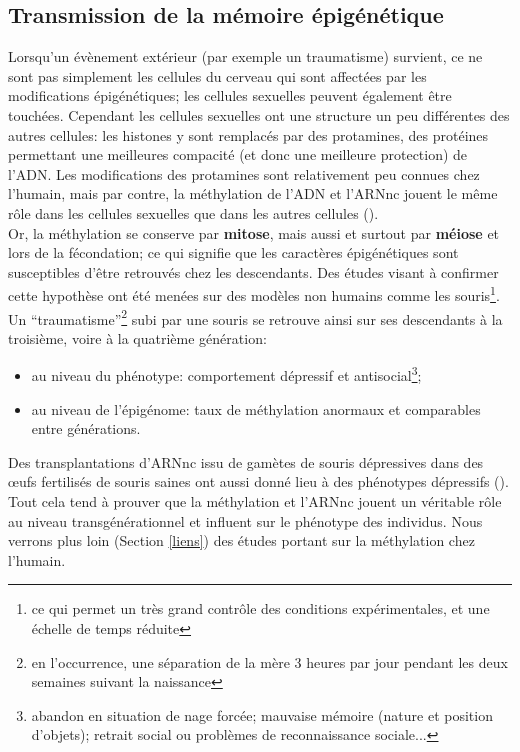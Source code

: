 \documentclass[french]{article}
\begin{document}
			\subsection{Transmission de la mémoire épigénétique}
				Lorsqu'un évènement extérieur (par exemple un traumatisme) survient, ce ne sont pas simplement les cellules du cerveau qui sont affectées par les modifications épigénétiques; les cellules sexuelles peuvent également être touchées. Cependant les cellules sexuelles ont une structure un peu différentes des autres cellules: les histones y sont remplacés par des protamines, des protéines permettant une meilleures compacité (et donc une meilleure protection) de l'ADN. Les modifications des protamines sont relativement peu connues chez l'humain, mais par contre, la méthylation de l'ADN et l'ARNnc jouent le même rôle dans les cellules sexuelles que dans les autres cellules (\cite{mansuy2016}).\\
				
				Or, la méthylation se conserve par \textbf{mitose}, mais aussi et surtout par \textbf{méiose} et lors de la fécondation; ce qui signifie que les caractères épigénétiques sont susceptibles d'être retrouvés chez les descendants. Des études visant à confirmer cette hypothèse ont été menées sur des modèles non humains comme les souris\footnote{ce qui permet un très grand contrôle des conditions expérimentales, et une échelle de temps réduite}. Un  ``traumatisme''\footnote{en l'occurrence, une séparation de la mère 3 heures par jour pendant les deux semaines suivant la naissance} subi par une souris se retrouve ainsi sur ses descendants à la troisième, voire à la quatrième génération:
				\begin{itemize}
					\item au niveau du phénotype: comportement dépressif et antisocial\footnote{abandon en situation de nage forcée; mauvaise mémoire (nature et position d'objets); retrait social ou problèmes de reconnaissance sociale...};
					\item au niveau de l'épigénome: taux de méthylation anormaux et comparables entre générations.
				\end{itemize}\vspace{2mm}
				Des transplantations d'ARNnc issu de gamètes de souris dépressives dans des œufs fertilisés de souris saines ont aussi donné lieu à des phénotypes dépressifs (\cite{mansuy2016}). Tout cela tend à prouver que la méthylation et l'ARNnc jouent un véritable rôle au niveau transgénérationnel et influent sur le phénotype des individus. Nous verrons plus loin (Section \ref{liens}) des études portant sur la méthylation chez l'humain.\\
				
\end{document}
